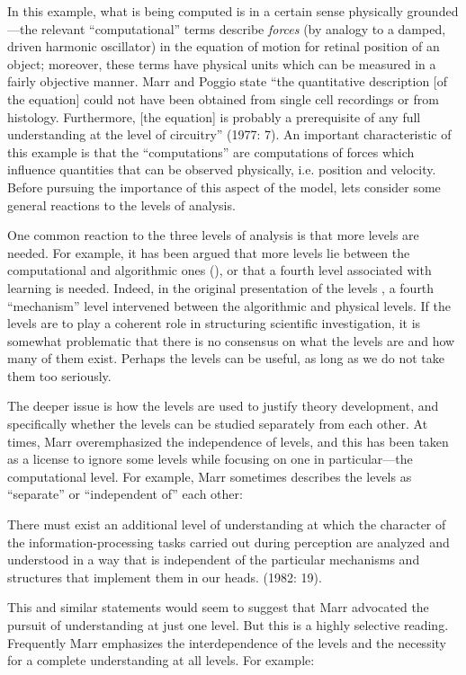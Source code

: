 In this example, what is being computed is in a certain sense physically grounded—the relevant “computational” terms describe \textit{forces} (by analogy to a damped, driven harmonic oscillator) in the equation of motion for retinal position of an object; moreover, these terms have physical units which can be measured in a fairly objective manner. Marr and Poggio state “the quantitative description [of the equation] could not have been obtained from single cell recordings or from histology. Furthermore, [the equation] is probably a prerequisite of any full understanding at the level of circuitry” (1977: 7). An important characteristic of this example is that the “computations” are computations of forces which influence quantities that can be observed physically, i.e. position and velocity. Before pursuing the importance of this aspect of the model, lets consider some general reactions to the levels of analysis.

One common reaction to the three levels of analysis is that more levels are needed. For example, it has been argued that more levels lie between the computational and algorithmic ones (\citealt{GriffithsEtAl2015,Pylyshyn1984}), or that a fourth level associated with learning is needed. Indeed, in the original presentation of the levels \citep{MarrPoggio1977}, a fourth “mechanism” level intervened between the algorithmic and physical levels. If the levels are to play a coherent role in structuring scientific investigation, it is somewhat problematic that there is no consensus on what the levels are and how many of them exist. Perhaps the levels can be useful, as long as we do not take them too seriously.

The deeper issue is how the levels are used to justify theory development, and specifically whether the levels can be studied separately from each other. At times, Marr overemphasized the independence of levels, and this has been taken as a license to ignore some levels while focusing on one in particular—the computational level. For example, Marr sometimes describes the levels as “separate” or “independent of” each other:

There must exist an additional level of understanding at which the character of the information-processing tasks carried out during perception are analyzed and understood in a way that is independent of the particular mechanisms and structures that implement them in our heads. (1982: 19).

This and similar statements would seem to suggest that Marr advocated the pursuit of understanding at just one level. But this is a highly selective reading. Frequently Marr emphasizes the interdependence of the levels and the necessity for a complete understanding at all levels. For example:

